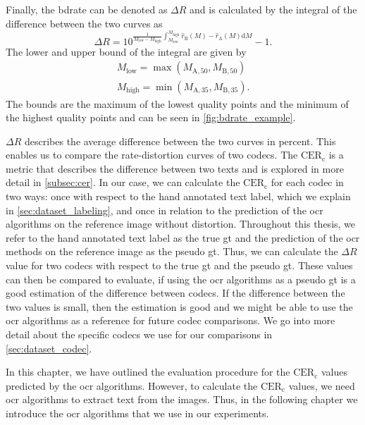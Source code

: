 Finally, the \gls{bdrate} can be denoted as $\Delta R$ and is calculated by the integral of the difference between the two curves as
\begin{equation}
    \Delta R = 10^{\frac{1}{M_{\text{low}}-M_{\text{high}}} \int_{M_{\text{low}}}^{M_{\text{high}}} \hat{r}_{\text{B}}(M) - \hat{r}_{\text{A}}(M) \text{d}M} - 1.
    \label{eq:bdrate}
\end{equation}
The lower and upper bound of the integral are given by
\begin{equation}
    \begin{aligned}
        M_{\text{low}} = \max\left(M_{\text{A},50}, M_{\text{B},50}\right) \\
        M_{\text{high}} = \min\left(M_{\text{A},35}, M_{\text{B},35}\right).
    \end{aligned}
    \label{eq:bounds}
\end{equation}
The bounds are the maximum of the lowest quality points and the minimum of the highest quality points and can be seen in \autoref{fig:bdrate_example}.


$\Delta R$ describes the average difference between the two curves in percent.
This enables us to compare the rate-distortion curves of two codecs.
The $\text{CER}_{\text{c}}$ is a metric that describes the difference between two texts and is explored in more detail in \autoref{subsec:cer}.
In our case, we can calculate the $\text{CER}_{\text{c}}$ for each codec in two ways:
once with respect to the hand annotated text label, which we explain in \autoref{sec:dataset_labeling}, and once in relation to the prediction of the \gls{ocr} algorithms on the reference image without distortion.
Throughout this thesis, we refer to the hand annotated text label as the true \gls{gt} and the prediction of the \gls{ocr} methods on the reference image as the pseudo \gls{gt}.
Thus, we can calculate the $\Delta R$ value for two codecs with respect to the true \gls{gt} and the pseudo \gls{gt}.
These values can then be compared to evaluate, if using the \gls{ocr} algorithms as a pseudo \gls{gt} is a good estimation of the difference between codecs.
If the difference between the two values is small, then the estimation is good and we might be able to use the \gls{ocr} algorithms as a reference for future codec comparisons.
We go into more detail about the specific codecs we use for our comparisons in \autoref{sec:dataset_codec}.

In this chapter, we have outlined the evaluation procedure for the $\text{CER}_{\text{c}}$ values predicted by the \gls{ocr} algorithms.
However, to calculate the $\text{CER}_{\text{c}}$ values, we need \gls{ocr} algorithms to extract text from the images.
Thus, in the following chapter we introduce the \gls{ocr} algorithms that we use in our experiments.
